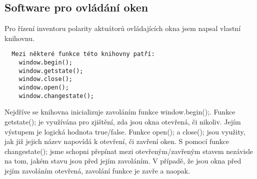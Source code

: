 \subsection{Software pro ovládání oken}
Pro řízení inventoru polarity aktuátorů ovládajících okna jsem napsal vlastní knihovnu.
\begin{verbatim}  Mezi některé funkce této knihovny patří:
    window.begin();         
    window.getstate();      
    window.close();         
    window.open();          
    window.changestate();
\end{verbatim}


Nejdříve se knihovna inicializuje zavoláním funkce window.begin();.
Funkce getstate(); je využívána pro zjištění, zda jsou okna otevřená, či nikoliv. 
Jejím výstupem je logická hodnota true/false.
Funkce open(); a close(); jsou využity, jak již jejich název napovídá k otevření, či zavření oken.
S pomocí funkce changestate(); jsme schopni přepínat mezi otevřeným/zavřeným stavem nezávisle na tom, jakém stavu jsou před jejím zavoláním.
V případě, že jsou okna před jejím zavoláním otevřená, zavolání funkce je zavře a naopak.

